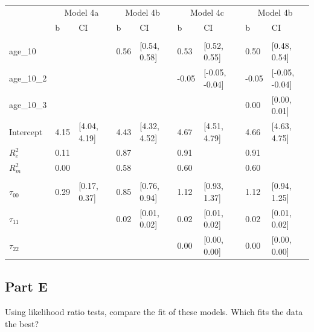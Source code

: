 \documentclass[]{article}
\begin{document}
\begin{table}[H]
\centering
\begin{tabular}{lllllllll}
\toprule
\multicolumn{1}{c}{ } & \multicolumn{2}{c}{Model 4a} & \multicolumn{2}{c}{Model 4b} & \multicolumn{2}{c}{Model 4c} & \multicolumn{2}{c}{Model 4b} \\
\cmidrule(l{2pt}r{2pt}){2-3} \cmidrule(l{2pt}r{2pt}){4-5} \cmidrule(l{2pt}r{2pt}){6-7} \cmidrule(l{2pt}r{2pt}){8-9}
 & b & CI & b & CI & b & CI & b & CI\\
\midrule
\addlinespace[0.3em]
\multicolumn{9}{l}{\textbf{Fixed}}\\
\hspace{1em}age\_10 &  &  & 0.56 & [0.54, 0.58] & 0.53 & [0.52, 0.55] & 0.50 & [0.48, 0.54]\\
\hspace{1em}age\_10\_2 &  &  &  &  & -0.05 & [-0.05, -0.04] & -0.05 & [-0.05, -0.04]\\
\hspace{1em}age\_10\_3 &  &  &  &  &  &  & 0.00 & [0.00, 0.01]\\
\hspace{1em}Intercept & 4.15 & [4.04, 4.19] & 4.43 & [4.32, 4.52] & 4.67 & [4.51, 4.79] & 4.66 & [4.63, 4.75]\\
$R^2_c$ & 0.11 &  & 0.87 &  & 0.91 &  & 0.91 & \\
$R^2_m$ & 0.00 &  & 0.58 &  & 0.60 &  & 0.60 & \\
\addlinespace[0.3em]
\multicolumn{9}{l}{\textbf{Random}}\\
\hspace{1em}$\tau_{00}$ & 0.29 & [0.17, 0.37] & 0.85 & [0.76, 0.94] & 1.12 & [0.93, 1.37] & 1.12 & [0.94, 1.25]\\
\hspace{1em}$\tau_{11}$ &  &  & 0.02 & [0.01, 0.02] & 0.02 & [0.01, 0.02] & 0.02 & [0.01, 0.02]\\
\hspace{1em}$\tau_{22}$ &  &  &  &  & 0.00 & [0.00, 0.00] & 0.00 & [0.00, 0.00]\\
\bottomrule
\end{tabular}
\end{table}

\subsection{Part E}\label{part-e}

Using likelihood ratio tests, compare the fit of these models. Which
fits the data the best?
\end{document}
